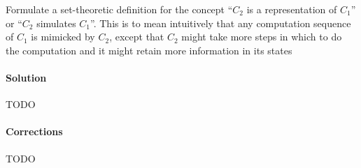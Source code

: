 \documentclass{report}
\newcommand{\say}[1]{``#1''}
\begin{document}
			Formulate a set-theoretic definition for the concept \say{$C_2$ is a representation of $C_1$} or \say{$C_2$ simulates $C_1$}. This is to mean intuitively that any computation sequence of $C_1$ is mimicked by $C_2$, except that $C_2$ might take more steps in which to do the computation and it might retain more information in its states
			
			\paragraph{Solution} TODO
			
			\paragraph{Corrections} TODO
			
		
		
\end{document}
